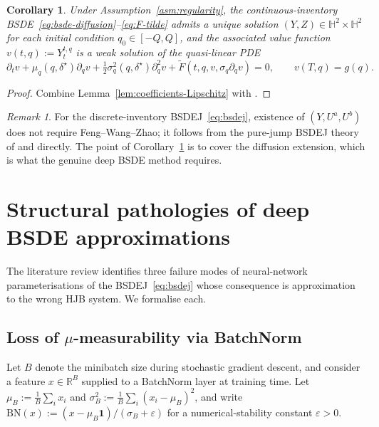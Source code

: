 \documentclass[11pt,a4paper]{article}
\newtheorem{corollary}[theorem]{Corollary}
\theoremstyle{definition}
\theoremstyle{remark}
\newtheorem{remark}[theorem]{Remark}
\newcommand{\R}{\mathbb{R}}
\begin{document}
\begin{corollary}\label{cor:feng-existence}
Under Assumption~\ref{asm:regularity}, the continuous-inventory
BSDE~\eqref{eq:bsde-diffusion}--\eqref{eq:F-tilde} admits a
unique solution $(Y, Z) \in \mathbb{H}^2 \times \mathbb{H}^2$ for
each initial condition $q_0 \in [-Q, Q]$, and the associated
value function $v(t, q) := Y_t^{t, q}$ is a weak solution of the
quasi-linear PDE
\begin{equation}\label{eq:cx-pde}
\partial_t v + \mu_q(q, \delta^\star) \partial_q v
+ \tfrac{1}{2} \sigma_q^2(q, \delta^\star) \partial_q^2 v
+ \widetilde{F}(t, q, v, \sigma_q \partial_q v) = 0,
\qquad v(T, q) = g(q).
\end{equation}
\end{corollary}

\begin{proof}
Combine Lemma~\ref{lem:coefficients-Lipschitz} with
\citep[Theorem~3.3]{feng2018}.
\end{proof}

\begin{remark}\label{rem:cx-existence-discrete}
For the discrete-inventory BSDEJ~\eqref{eq:bsdej}, existence of
$(Y, U^a, U^b)$ does not require Feng--Wang--Zhao; it follows from
the pure-jump BSDEJ theory of \citet{barles1997} and
\citet{tang1994} directly.  The point of
Corollary~\ref{cor:feng-existence} is to cover the diffusion
extension, which is what the genuine deep BSDE method requires.
\end{remark}

\section{Structural pathologies of deep BSDE approximations}
\label{sec:pathologies}

The literature review identifies three failure modes of
neural-network parameterisations of the BSDEJ~\eqref{eq:bsdej}
whose consequence is approximation to the wrong HJB system.  We
formalise each.

\subsection{Loss of $\mu$-measurability via BatchNorm}

Let $B$ denote the minibatch size during stochastic gradient
descent, and consider a feature $x \in \R^B$ supplied to a
BatchNorm layer at training time.  Let
$\mu_B := \frac{1}{B} \sum_i x_i$ and
$\sigma_B^2 := \frac{1}{B} \sum_i (x_i - \mu_B)^2$, and write
$\mathrm{BN}(x) := (x - \mu_B \mathbf{1}) / (\sigma_B + \varepsilon)$
for a numerical-stability constant $\varepsilon > 0$.
\end{document}

